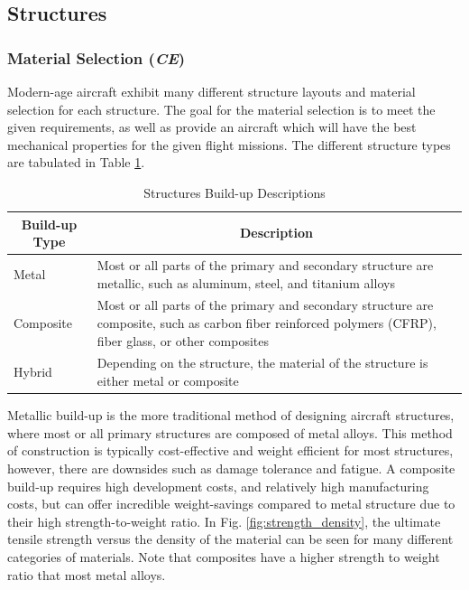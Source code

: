 \subsection{Structures}
\subsubsection{Material Selection (\textit{CE})}
Modern-age aircraft exhibit many different structure layouts and material selection for each structure. The goal for the material selection is to meet the given requirements, as well as provide an aircraft which will have the best mechanical properties for the given flight missions. The different structure types are tabulated in Table \ref{tab:structure_material_table}.

\begin{table}[!h]
\centering
\caption{Structures Build-up Descriptions }
\label{tab:structure_material_table}
\begin{tabular}{ |p{2cm}||p{13cm}| }
\toprule
\multicolumn{1}{|c||}{\textbf{Build-up Type}} & \multicolumn{1}{c|}{\textbf{Description}}                                                                                                                       \\ \hline\hline
Metal                                       & Most or all parts of the primary and secondary structure are metallic, such as aluminum, steel, and titanium alloys                                             \\ \hline
Composite                                    & Most or all parts of the primary and secondary structure are composite, such as carbon fiber reinforced polymers (CFRP), fiber glass, or other composites \\ \hline
Hybrid                                       & Depending on the structure, the material of the structure is either metal or composite                                                                            \\ \bottomrule
\end{tabular}
\end{table}

Metallic build-up is the more traditional method of designing aircraft structures, where most or all primary structures are composed of metal alloys. This method of construction is typically cost-effective and weight efficient for most structures, however, there are downsides such as damage tolerance and fatigue. A composite build-up requires high development costs, and relatively high manufacturing costs, but can offer incredible weight-savings compared to metal structure due to their high strength-to-weight ratio. In Fig. \ref{fig:strength_density}, the ultimate tensile strength versus the density of the material can be seen for many different categories of materials. Note that composites have a higher strength to weight ratio that most metal alloys. 


